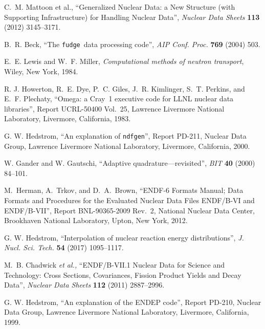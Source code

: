 \documentclass[11pt]{report}
\newcommand{\xndfgen}{\texttt{fudge}}
\newcommand{\ndfgen}{\texttt{ndfgen}}
\begin{document}
\begin{thebibliography}{99}
\frenchspacing

 C.~M. Mattoon et al.,
``Generalized Nuclear Data: a New Structure (with Supporting Infrastructure) 
for Handling Nuclear Data'',
\textit{Nuclear Data Sheets} \textbf{113} (2012) 3145--3171.

 B.~R. Beck,
``The \xndfgen\ data processing code'',
\textit{AIP Conf. Proc.} \textbf{769} (2004) 503.

 E.~E. Lewis and W.~F. Miller,
\textit{Computational methods of neutron transport},
Wiley, New York, 1984.

 R. J. Howerton, R.~E. Dye, P.~C. Giles,
J.~R. Kimlinger, S.~T. Perkins, and E.~F. Plechaty,
``Omega: a Cray~1 executive code for LLNL nuclear data
libraries'',
Report UCRL-50400 Vol.~25, 
Lawrence Livermore National Laboratory, Livermore, California,
1983.

 G. W. Hedstrom, ``An explanation of
\ndfgen'', Report PD-211, Nuclear Data Group,
Lawrence Livermore National Laboratory, Livermore, California,
2000.

 W. Gander and W. Gautschi,
``Adaptive quadrature---revisited'', \textit{BIT} \textbf{40} (2000) 84--101.

 M.~Herman, A.~Trkov, and D.\ A.\ Brown,
``ENDF-6 Formats Manual;
Data Formats and Procedures for the Evaluated Nuclear Data Files ENDF/B-VI and ENDF/B-VII'',
Report BNL-90365-2009 Rev.~2,
National Nuclear Data Center,
Brookhaven National Laboratory,
Upton, New York, 2012.

 G. W. Hedstrom, 
``Interpolation of nuclear reaction energy distributions'', 
\textit{J. Nucl. Sci. Tech.} \textbf{54} (2017) 1095--1117.

 M.~B. Chadwick \textit{et al.,}
``ENDF/B-VII.1 Nuclear Data for Science and Technology: Cross Sections, Covariances, Fission Product Yields and Decay Data'',
\textit{Nuclear Data Sheets} \textbf{112} (2011) 2887--2996.


 G. W. Hedstrom, ``An explanation of
the \textsf{ENDEP} code'', Report PD-210, Nuclear Data Group,
Lawrence Livermore National Laboratory, Livermore, California,
1999.


\end{thebibliography}
\end{document}
